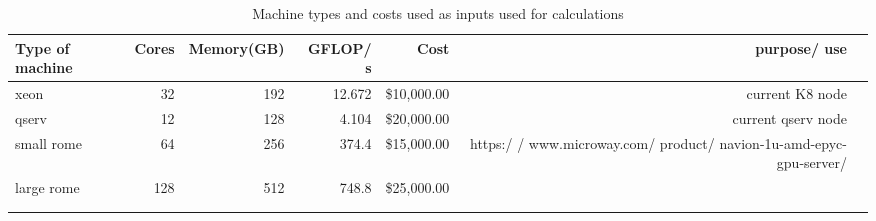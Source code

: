\tiny \begin{longtable} { |p{}  |r  |r  |r  |r  |r  |r |} 
\caption{Machine types and costs used as inputs used for calculations \label{tab:Machines}}\\ 
\hline 
{Type of machine }&{Cores}&{Memory(GB)}&{GFLOP/ s}&{Cost}&{purpose/ use } \\ \hline
{xeon }&{32}&{192}&{12.672}&{\$10,000.00}&{current K8 node } \\ \hline
{qserv }&{12}&{128}&{4.104}&{\$20,000.00}&{current qserv node } \\ \hline
{small rome  }&{64}&{256}&{374.4}&{\$15,000.00}&{https:/ / www.microway.com/ product/ navion-1u-amd-epyc-gpu-server/ } \\ \hline
{large rome }&{128}&{512}&{748.8}&{\$25,000.00}& \\ \hline
{}&{}&{}&{}&{}&{} \\ \hline
{}&{}&{}&{}&{}&{} \\ \hline
\end{longtable} \normalsize
